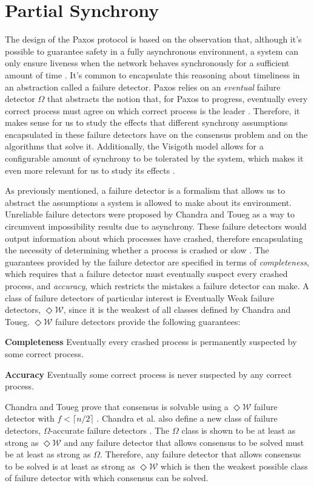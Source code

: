\section{Partial Synchrony} \label{Partial Synchrony}
The design of the Paxos protocol is based on the observation that, although it's possible to guarantee safety in a fully asynchronous environment, a system can only ensure liveness when the network behaves synchronously for a sufficient amount of time \cite{Lamport2001}. It's common to encapsulate this reasoning about timeliness in an abstraction called a failure detector. Paxos relies on an \textit{eventual} failure detector $\Omega$ that abstracts the notion that, for Paxos to progress, eventually every correct process must agree on which correct process is the leader \cite{vukolic2012quorum}. Therefore, it makes sense for us to study the effects that different synchrony assumptions encapsulated in these failure detectors have on the consensus problem and on the algorithms that solve it. Additionally, the Visigoth model allows for a configurable amount of synchrony to be tolerated by the system, which makes it even more relevant for us to study its effects \cite{Porto2015}. \par
As previously mentioned, a failure detector is a formalism that allows us to abstract the assumptions a system is allowed to make about its environment. Unreliable failure detectors were proposed by Chandra and Toueg as a way to circumvent impossibility results due to asynchrony. These failure detectors would output information about which processes have crashed, therefore encapsulating the necessity of determining whether a process is crashed or slow \cite{DeepakChandra1996}. The guarantees provided by the failure detector are specified in terms of \textit{completeness}, which requires that a failure detector must eventually suspect every crashed process, and \textit{accuracy}, which restricts the mistakes a failure detector can make. A class of failure detectors of particular interest is Eventually Weak failure detectors, $\Diamond\mathcal{W}$, since it is the weakest of all classes defined by Chandra and Toueg. $\Diamond\mathcal{W}$ failure detectors provide the following guarantees:\par
\textbf{Completeness} Eventually every crashed process is permanently suspected by some correct process.\par
\textbf{Accuracy} Eventually some correct process is never suspected by any correct process.\par
Chandra and Toueg prove that consensus is solvable using a $\Diamond\mathcal{W}$ failure detector with $f < \lceil n/2 \rceil$ \cite{DeepakChandra1996}. Chandra et al. also define a new class of failure detectors, $\Omega$-accurate failure detectors \cite{Chandra1996}. The $\Omega$ class is shown to be at least as strong as $\Diamond\mathcal{W}$ and any failure detector that allows consensus to be solved must be at least as strong as $\Omega$. Therefore, any failure detector that allows consensus to be solved is at least as strong as $\Diamond\mathcal{W}$ which is then the weakest possible class of failure detector with which consensus can be solved. \par
